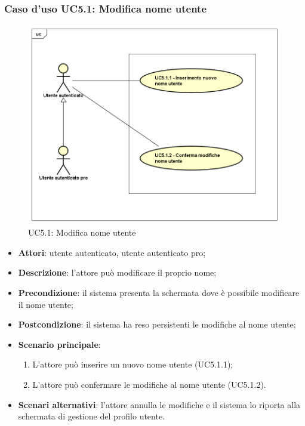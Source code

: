 \subsubsection{Caso d'uso UC5.1: Modifica nome utente}
\label{UC5.1}
\begin{figure}
	\centering
	\includegraphics[scale=0.5]{UML/UC5_1.png}
	\caption{UC5.1: Modifica nome utente}
\end{figure}
\begin{itemize}
	\item \textbf{Attori}: utente autenticato, utente autenticato pro;
	\item \textbf{Descrizione}: l'attore può modificare il proprio nome;
	\item \textbf{Precondizione}: il sistema presenta la schermata dove è possibile modificare il nome utente;
	\item \textbf{Postcondizione}: il sistema ha reso persistenti le modifiche al nome utente;
	\item \textbf{Scenario principale}:
		\begin{enumerate}
			\item L'attore può inserire un nuovo nome utente (UC5.1.1);
			\item L'attore può confermare le modifiche al nome utente (UC5.1.2).
		\end{enumerate}
	\item \textbf{Scenari alternativi}: l'attore annulla le modifiche e il sistema lo riporta alla schermata di gestione del profilo utente.
\end{itemize}

